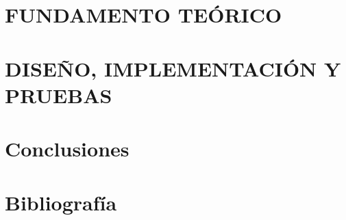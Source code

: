 \documentclass[a4paper,11pt,final]{book}
\begin{document}
 




\newpage
{}
\pagestyle{fancy} 
\tableofcontents







\part{FUNDAMENTO TEÓRICO}




\part{DISEÑO, IMPLEMENTACIÓN Y PRUEBAS}




\part{Conclusiones}
 			




\newpage
\part{Bibliografía}
\nocite{*} 


\end{document}
